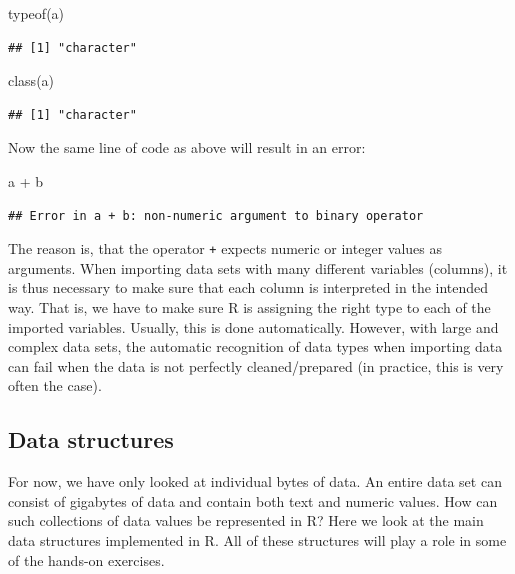 \documentclass[
  12pt,
]{style/krantz}
\newenvironment{Shaded}{\begin{snugshade}}{\end{snugshade}}
\newcommand{\FunctionTok}[1]{\textcolor[rgb]{0.00,0.00,0.00}{#1}}
\newcommand{\NormalTok}[1]{#1}
\newcommand{\SpecialCharTok}[1]{\textcolor[rgb]{0.00,0.00,0.00}{#1}}
\begin{document}
\begin{Shaded}
\begin{Highlighting}[]
\FunctionTok{typeof}\NormalTok{(a)}
\end{Highlighting}
\end{Shaded}

\begin{verbatim}
## [1] "character"
\end{verbatim}

\begin{Shaded}
\begin{Highlighting}[]
\FunctionTok{class}\NormalTok{(a)}
\end{Highlighting}
\end{Shaded}

\begin{verbatim}
## [1] "character"
\end{verbatim}

Now the same line of code as above will result in an error:

\begin{Shaded}
\begin{Highlighting}[]
\NormalTok{a }\SpecialCharTok{+}\NormalTok{ b}
\end{Highlighting}
\end{Shaded}

\begin{verbatim}
## Error in a + b: non-numeric argument to binary operator
\end{verbatim}

The reason is, that the operator \texttt{+} expects numeric or integer values as arguments. When importing data sets with many different variables (columns), it is thus necessary to make sure that each column is interpreted in the intended way. That is, we have to make sure R is assigning the right type to each of the imported variables. Usually, this is done automatically. However, with large and complex data sets, the automatic recognition of data types when importing data can fail when the data is not perfectly cleaned/prepared (in practice, this is very often the case).

\hypertarget{data-structures}{%
\subsection{Data structures}\label{data-structures}}

For now, we have only looked at individual bytes of data. An entire data set can consist of gigabytes of data and contain both text and numeric values. How can such collections of data values be represented in R? Here we look at the main data structures implemented in R. All of these structures will play a role in some of the hands-on exercises.
\end{document}
